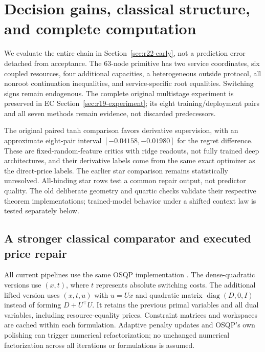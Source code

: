 \section{Decision gains, classical structure, and complete computation}\label{sec:r22-empirical}
We evaluate the entire chain in Section~\ref{sec:r22-early}, not a prediction error detached from acceptance. The 63-node primitive has two service coordinates, six coupled resources, four additional capacities, a heterogeneous outside protocol, all nonroot continuation inequalities, and service-specific root equalities. Switching signs remain endogenous. The complete original multistage experiment is preserved in EC Section~\ref{sec:r19-experiment}; its eight training/deployment pairs and all seven methods remain evidence, not discarded predecessors.

The original paired tanh comparison favors derivative supervision, with an approximate eight-pair interval $[-0.04158,-0.01980]$ for the regret difference. These are fixed-random-feature critics with ridge readouts, not fully trained deep architectures, and their derivative labels come from the same exact optimizer as the direct-price labels. The earlier star comparison remains statistically unresolved. All-binding star rows test a common repair output, not predictor quality. The old deliberate geometry and quartic checks validate their respective theorem implementations; trained-model behavior under a shifted context law is tested separately below.

\subsection{A stronger classical comparator and executed price repair}
All current pipelines use the same OSQP implementation \citep{Stellato2020}. The dense-quadratic versions use $(x,t)$, where $t$ represents absolute switching costs. The additional lifted version uses $(x,t,u)$ with $u=Ux$ and quadratic matrix $\operatorname{diag}(D,0,I)$ instead of forming $D+U^\top U$. It retains the previous primal variables and all dual variables, including resource-equality prices. Constraint matrices and workspaces are cached within each formulation. Adaptive penalty updates and OSQP's own polishing can trigger numerical refactorization; no unchanged numerical factorization across all iterations or formulations is assumed.

